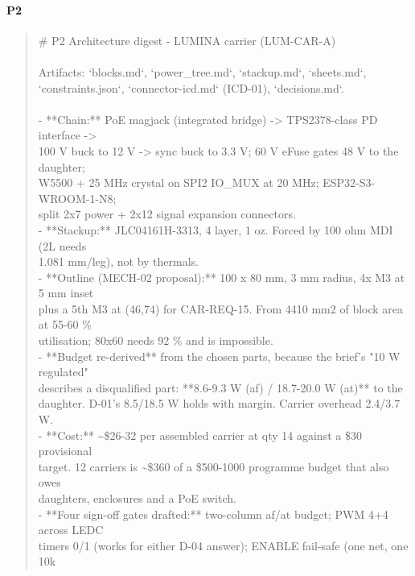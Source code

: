 \documentclass[11pt,a4paper]{article}
\begin{document}
\paragraph*{P2}
\begin{quote}\small\ttfamily\raggedright
\# P2 Architecture digest - LUMINA carrier (LUM-CAR-A)\\
~\\
Artifacts: `blocks.md`, `power\_tree.md`, `stackup.md`, `sheets.md`,\\
`constraints.json`, `connector-icd.md` (ICD-01), `decisions.md`.\\
~\\
- {*}{*}Chain:{*}{*} PoE magjack (integrated bridge) -\textgreater{} TPS2378-class PD interface -\textgreater{}\\
  100 V buck to 12 V -\textgreater{} sync buck to 3.3 V; 60 V eFuse gates 48 V to the daughter;\\
  W5500 + 25 MHz crystal on SPI2 IO\_MUX at 20 MHz; ESP32-S3-WROOM-1-N8;\\
  split 2x7 power + 2x12 signal expansion connectors.\\
- {*}{*}Stackup:{*}{*} JLC04161H-3313, 4 layer, 1 oz. Forced by 100 ohm MDI (2L needs\\
  1.081 mm/leg), not by thermals.\\
- {*}{*}Outline (MECH-02 proposal):{*}{*} 100 x 80 mm, 3 mm radius, 4x M3 at 5 mm inset\\
  plus a 5th M3 at (46,74) for CAR-REQ-15. From 4410 mm2 of block area at 55-60 \%\\
  utilisation; 80x60 needs 92 \% and is impossible.\\
- {*}{*}Budget re-derived{*}{*} from the chosen parts, because the brief's "10 W regulated"\\
  describes a disqualified part: {*}{*}8.6-9.3 W (af) / 18.7-20.0 W (at){*}{*} to the\\
  daughter. D-01's 8.5/18.5 W holds with margin. Carrier overhead 2.4/3.7 W.\\
- {*}{*}Cost:{*}{*} \textasciitilde{}\$26-32 per assembled carrier at qty 14 against a \$30 provisional\\
  target. 12 carriers is \textasciitilde{}\$360 of a \$500-1000 programme budget that also owes\\
  daughters, enclosures and a PoE switch.\\
- {*}{*}Four sign-off gates drafted:{*}{*} two-column af/at budget; PWM 4+4 across LEDC\\
  timers 0/1 (works for either D-04 answer); ENABLE fail-safe (one net, one 10k\\

\end{quote}
\end{document}

